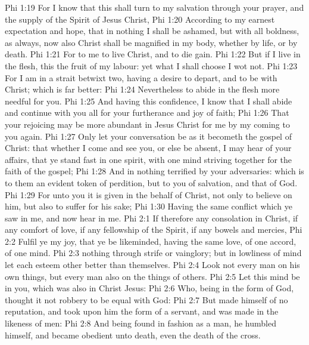 \vs Phi 1:19 For I know that this shall turn to my salvation through your prayer, and the supply of the Spirit of Jesus Christ,
\vs Phi 1:20 According to my earnest expectation and  hope, that in nothing I shall be ashamed, but  with all boldness, as always,  now also Christ shall be magnified in my body, whether  by life, or by death.
\vs Phi 1:21 For to me to live  Christ, and to die  gain.
\vs Phi 1:22 But if I live in the flesh, this  the fruit of my labour: yet what I shall choose I wot not.
\vs Phi 1:23 For I am in a strait betwixt two, having a desire to depart, and to be with Christ; which is far better:
\vs Phi 1:24 Nevertheless to abide in the flesh  more needful for you.
\vs Phi 1:25 And having this confidence, I know that I shall abide and continue with you all for your furtherance and joy of faith;
\vs Phi 1:26 That your rejoicing may be more abundant in Jesus Christ for me by my coming to you again.
\vs Phi 1:27 Only let your conversation be as it becometh the gospel of Christ: that whether I come and see you, or else be absent, I may hear of your affairs, that ye stand fast in one spirit, with one mind striving together for the faith of the gospel;
\vs Phi 1:28 And in nothing terrified by your adversaries: which is to them an evident token of perdition, but to you of salvation, and that of God.
\vs Phi 1:29 For unto you it is given in the behalf of Christ, not only to believe on him, but also to suffer for his sake;
\vs Phi 1:30 Having the same conflict which ye saw in me, and now hear  in me.
\vs Phi 2:1 If  therefore any consolation in Christ, if any comfort of love, if any fellowship of the Spirit, if any bowels and mercies,
\vs Phi 2:2 Fulfil ye my joy, that ye be likeminded, having the same love,  of one accord, of one mind.
\vs Phi 2:3  nothing  through strife or vainglory; but in lowliness of mind let each esteem other better than themselves.
\vs Phi 2:4 Look not every man on his own things, but every man also on the things of others.
\vs Phi 2:5 Let this mind be in you, which was also in Christ Jesus:
\vs Phi 2:6 Who, being in the form of God, thought it not robbery to be equal with God:
\vs Phi 2:7 But made himself of no reputation, and took upon him the form of a servant, and was made in the likeness of men:
\vs Phi 2:8 And being found in fashion as a man, he humbled himself, and became obedient unto death, even the death of the cross.
